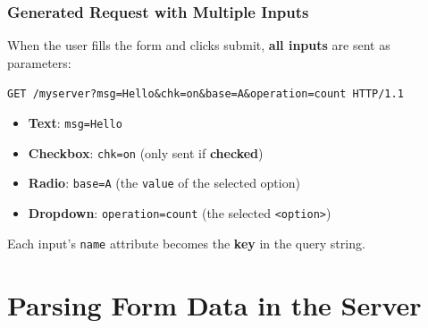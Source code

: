 \documentclass[xcolor=table]{beamer}
\begin{document}
\begin{frame}
\frametitle{Generated Request with Multiple Inputs}

When the user fills the form and clicks submit, \textbf{all inputs} are sent as parameters:

\vspace{0.3cm}

\begin{center}
\texttt{GET /myserver?msg=Hello\&chk=on\&base=A\&operation=count HTTP/1.1}
\end{center}

\vspace{0.3cm}

\begin{itemize}
\item \textbf{Text}: \texttt{msg=Hello}
\item \textbf{Checkbox}: \texttt{chk=on} (only sent if \textbf{checked})
\item \textbf{Radio}: \texttt{base=A} (the \texttt{value} of the selected option)
\item \textbf{Dropdown}: \texttt{operation=count} (the selected \texttt{<option>})
\end{itemize}

\vspace{0.3cm}

Each input's \texttt{name} attribute becomes the \textbf{key} in the query string.

\end{frame}


\section{Parsing Form Data in the Server}
\end{document}
